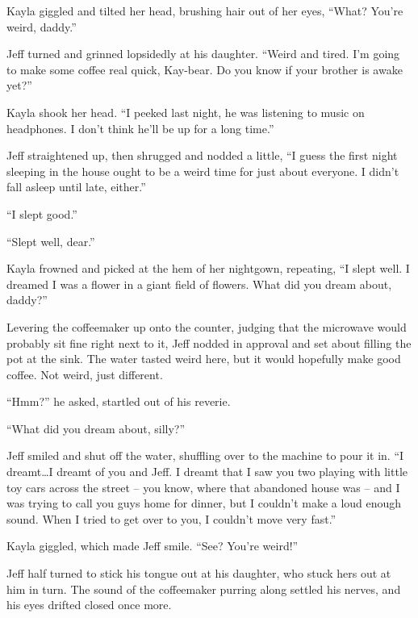 Kayla giggled and tilted her head, brushing hair out of her eyes, ``What?  You're weird, daddy.''

Jeff turned and grinned lopsidedly at his daughter.  ``Weird and tired.  I'm going to make some coffee real quick, Kay-bear.  Do you know if your brother is awake yet?''

Kayla shook her head.  ``I peeked last night, he was listening to music on headphones.  I don't think he'll be up for a long time.''

Jeff straightened up, then shrugged and nodded a little, ``I guess the first night sleeping in the house ought to be a weird time for just about everyone.  I didn't fall asleep until late, either.''

``I slept good.''

``Slept well, dear.''

Kayla frowned and picked at the hem of her nightgown, repeating, ``I slept well.  I dreamed I was a flower in a giant field of flowers.  What did you dream about, daddy?''

Levering the coffeemaker up onto the counter, judging that the microwave would probably sit fine right next to it, Jeff nodded in approval and set about filling the pot at the sink.  The water tasted weird here, but it would hopefully make good coffee.  Not weird, just different.

``Hmm?'' he asked, startled out of his reverie.

``What did you dream about, silly?''

Jeff smiled and shut off the water, shuffling over to the machine to pour it in.  ``I dreamt\ldots{}I dreamt of you and Jeff.  I dreamt that I saw you two playing with little toy cars across the street -- you know, where that abandoned house was -- and I was trying to call you guys home for dinner, but I couldn't make a loud enough sound.  When I tried to get over to you, I couldn't move very fast.''

Kayla giggled, which made Jeff smile.  ``See?  You're weird!''

Jeff half turned to stick his tongue out at his daughter, who stuck hers out at him in turn.  The sound of the coffeemaker purring along settled his nerves, and his eyes drifted closed once more.
